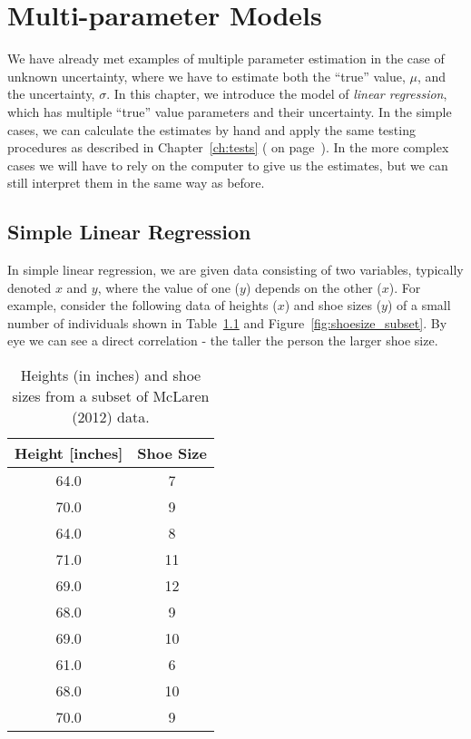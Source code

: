 \chapter{Multi-parameter Models}\label{ch:multiparam}

We have already met examples of multiple parameter estimation in the case of unknown uncertainty, where we have to estimate both the ``true'' value, $\mu$, and the uncertainty, $\sigma$.  In this chapter, we introduce the model of {\em linear regression}, which has multiple ``true'' value parameters and their uncertainty.  In the simple cases, we can calculate the estimates by hand and apply the same testing procedures as described in Chapter~\ref{ch:tests} (\emph{} on page~\pageref{ch:tests}).  In the more complex cases we will have to rely on the computer to give us the estimates, but we can still interpret them in the same way as before.

\section{Simple Linear Regression}

In simple linear regression, we are given data consisting of two variables, typically denoted $x$ and $y$, where the value of one ($y$) depends on the other ($x$).  For example, consider the following data of heights ($x$) and shoe sizes ($y$) of a small number of individuals\cite{mclaren2012using} shown in Table~\ref{tbl:shoesize_subset} and Figure~\ref{fig:shoesize_subset}.  By eye we can see a direct correlation - the taller the person the larger shoe size.  

\begin{table}
\begin{center}
\begin{tabular}{cc}
Height [inches] & Shoe Size \\ \hline\hline
64.0 & 7\\
70.0 & 9\\
64.0 & 8\\
71.0 & 11\\
69.0 & 12\\
68.0 & 9\\
69.0 & 10\\
61.0 & 6\\
68.0 & 10\\
70.0 & 9
\end{tabular}
\end{center}
\label{tbl:shoesize_subset}
\caption{Heights (in inches) and shoe sizes from a subset of McLaren (2012) data.}
\end{table}

